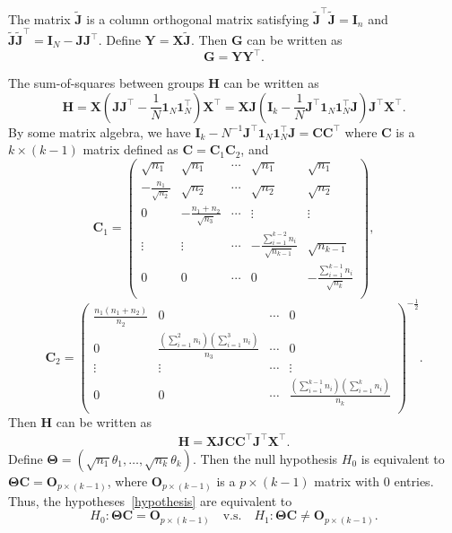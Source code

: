 \documentclass[12pt]{article} %
\newcommand{\bX}{\mathbf{X}}
\newcommand{\bY}{\mathbf{Y}}
\newcommand{\bH}{\mathbf{H}}
\newcommand{\bG}{\mathbf{G}}
\newcommand{\bJ}{\mathbf{J}}
\newcommand{\bC}{\mathbf{C}}
\newcommand{\bO}{\mathbf{O}}
\newcommand{\bI}{\mathbf{I}}
\newcommand{\bfsym}[1]{\ensuremath{\boldsymbol{#1}}}
\def\bTheta {\bfsym {\Theta}}
\theoremstyle{definition}
\begin{document}
The matrix $\tilde{\bJ}$ is a column orthogonal matrix  satisfying $\tilde{\bJ}^\top\tilde{\bJ}=\bI_{n}$ and $\tilde{\bJ}\tilde{\bJ}^\top =\bI_N-\bJ\bJ^\top$.
Define $\bY=\bX\tilde{\bJ}$.
Then $\bG$ can be written as
$$\bG=
\bY \bY^\top.
$$

The sum-of-squares between groups $\bH$ can be written as
$$
        \bH=\bX(\bJ\bJ^\top-\frac{1}{N}\mathbf{1}_N\mathbf{1}_N^\top)\bX^\top
=\bX \bJ(\bI_k-\frac{1}{N}\bJ^\top\mathbf{1}_N \mathbf{1}_N^\top \bJ)\bJ^\top \bX^\top.
$$
By some matrix algebra, we have $\bI_k-N^{-1}\bJ^\top\mathbf{1}_N \mathbf{1}_N^\top \bJ=\bC\bC^\top$
where $\bC$ is a $k\times (k-1)$ matrix defined as $\bC=\bC_1\bC_2$, and
 $$
\bC_1=\begin{pmatrix}
    \sqrt{n_1}&\sqrt{n_1}&\cdots&\sqrt{n_1}&\sqrt{n_1}\\
    -\frac{n_1}{\sqrt{n_2}}&\sqrt{n_2}&\cdots&\sqrt{n_2}&\sqrt{n_2}\\
    0&-\frac{n_1+n_2}{\sqrt{n_3}}&\cdots&\vdots&\vdots\\
    \vdots&\vdots&\cdots&-\frac{\sum_{i=1}^{k-2}n_i}{\sqrt{n_{k-1}}}&\sqrt{n_{k-1}}\\
    0&0&\cdots&0&-\frac{\sum_{i=1}^{k-1}n_i}{\sqrt{n_k}}\\
\end{pmatrix},
 $$
 $$
\bC_2=\begin{pmatrix}
    \frac{n_1(n_1+n_2)}{n_2}&0&\cdots&0\\
    0&\frac{(\sum_{i=1}^2 n_i)(\sum_{i=1}^3 n_i)}{n_3}&\cdots&0\\
    \vdots&\vdots&\cdots&\vdots\\
    0&0&\cdots&\frac{(\sum_{i=1}^{k-1} n_i)(\sum_{i=1}^k n_i)}{n_{k}}\\
\end{pmatrix}^{-\frac{1}{2}}.
$$
Then $\bH$ can be written as
\begin{equation*}
    \begin{aligned}
        \bH=\bX \bJ\bC \bC^\top \bJ^\top \bX^\top.
    \end{aligned}
\end{equation*}
Define $\bTheta=(\sqrt{n_1}\theta_1,\ldots,\sqrt{n_k}\theta_k)$.
 Then the null hypothesis $H_0$ is equivalent to $\bTheta \bC=\bO_{p\times (k-1)}$, where $\bO_{p\times (k-1)}$ is a $p\times (k-1)$ matrix with $0$ entries.
 Thus, the hypotheses~\eqref{hypothesis} are equivalent to
 $$
 H_0:\bTheta \bC=\bO_{p\times (k-1)}\quad \text{v.s.}\quad H_1: \bTheta \bC\neq \bO_{p\times (k-1)}.
 $$
\end{document}
